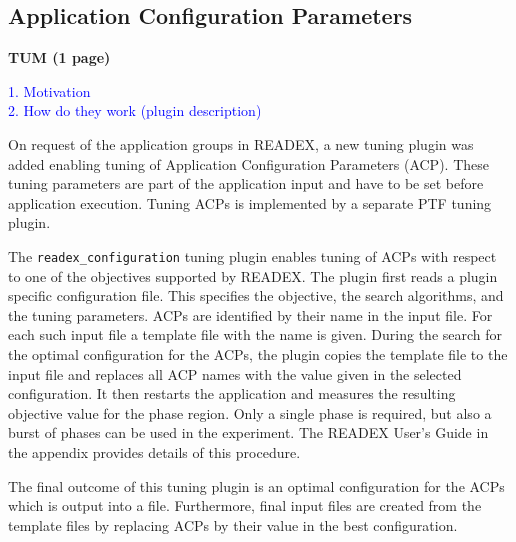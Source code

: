 \subsection{Application Configuration Parameters} \label{sec:acp}
\textbf{TUM (1 page)}

\textcolor{blue}{
1. Motivation \\
2. How do they work (plugin description)
}

On request of the application groups in READEX, a new tuning plugin was added enabling tuning of Application Configuration Parameters (ACP). These tuning parameters are part of the  application input and have to be set before application execution. Tuning ACPs is implemented by a separate PTF tuning plugin.

The \texttt{readex\_configuration} tuning plugin enables tuning of ACPs with respect to one of the objectives supported by READEX. The plugin first reads a plugin specific configuration file. This specifies the objective, the search algorithms, and the tuning parameters. ACPs are identified by their name in the input file. For each such input file a template file with the name is given. During the search for the optimal configuration for the ACPs, the plugin copies the template file to the input file and replaces all ACP names with the value given in the selected configuration. It then restarts the application and measures the resulting objective value for the phase region. Only a single phase is required, but also a burst of phases can be used in the experiment. The READEX User's Guide in the appendix provides details of this procedure. 

The final outcome of this tuning plugin is an optimal configuration for the ACPs which is output into a file. Furthermore, final input files are created from the template files by replacing ACPs by their value in the best configuration.  
